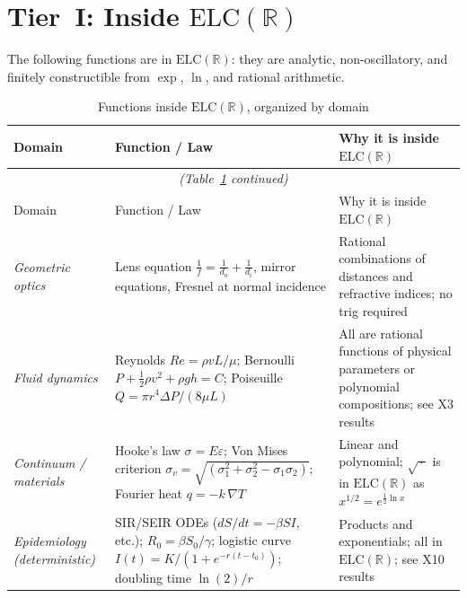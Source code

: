 \documentclass[12pt,a4paper]{article}
\theoremstyle{definition}
\newcommand{\ELC}{\mathrm{ELC}(\mathbb{R})}
\begin{document}
\section{Tier~I: Inside \texorpdfstring{$\ELC$}{ELC(R)}}
\label{sec:inside}

The following functions are in $\ELC$: they are analytic, non-oscillatory,
and finitely constructible from $\exp$, $\ln$, and rational arithmetic.

\begin{longtable}{@{}p{4.2cm}p{4.8cm}p{5.3cm}@{}}
\caption{Functions inside $\ELC$, organized by domain}
\label{tab:inside}\\
\toprule
Domain & Function / Law & Why it is inside $\ELC$ \\
\midrule
\endfirsthead
\multicolumn{3}{c}{\emph{(Table~\ref{tab:inside} continued)}}\\
\toprule
Domain & Function / Law & Why it is inside $\ELC$ \\
\midrule
\endhead
\bottomrule
\endfoot
\textit{Geometric optics} &
Lens equation $\frac{1}{f}=\frac{1}{d_o}+\frac{1}{d_i}$, mirror equations,
Fresnel at normal incidence &
Rational combinations of distances and refractive indices; no trig required \\[4pt]
\textit{Fluid dynamics} &
Reynolds $Re=\rho v L/\mu$; Bernoulli $P+\tfrac{1}{2}\rho v^2+\rho g h=C$;
Poiseuille $Q=\pi r^4 \Delta P/(8\mu L)$ &
All are rational functions of physical parameters or polynomial compositions;
see X3 results \\[4pt]
\textit{Continuum / materials} &
Hooke's law $\sigma=E\varepsilon$;
Von Mises criterion $\sigma_v = \sqrt{(\sigma_1^2+\sigma_2^2-\sigma_1\sigma_2)}$;
Fourier heat $q=-k\,\nabla T$ &
Linear and polynomial; $\sqrt{\,\cdot\,}$ is in $\ELC$ as $x^{1/2}=e^{\frac{1}{2}\ln x}$ \\[4pt]
\textit{Epidemiology (deterministic)} &
SIR/SEIR ODEs ($dS/dt=-\beta SI$, etc.); $R_0=\beta S_0/\gamma$;
logistic curve $I(t)=K/(1+e^{-r(t-t_0)})$; doubling time $\ln(2)/r$ &
Products and exponentials; all in $\ELC$; see X10 results \\[4pt]

\end{longtable}
\end{document}
